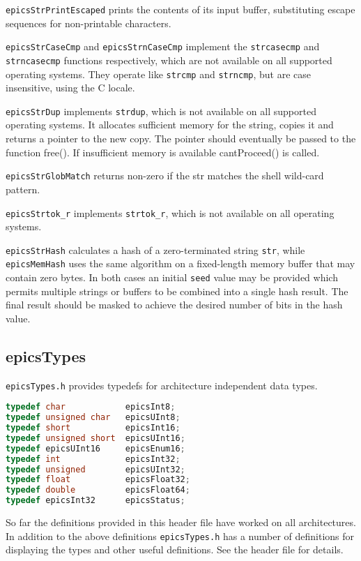 \verb|epicsStrPrintEscaped| prints the contents of its input buffer, substituting escape sequences for non-printable characters.

\verb|epicsStrCaseCmp| and \verb|epicsStrnCaseCmp| implement the \verb|strcasecmp| and \verb|strncasecmp| functions respectively, which are not available on all supported operating systems.
They operate like \verb|strcmp| and \verb|strncmp|, but are case insensitive, using the C locale.

\verb|epicsStrDup| implements \verb|strdup|, which is not available on all supported operating systems.
It allocates sufficient memory for the string, copies it and returns a pointer to the new copy.
The pointer should eventually be passed to the function free().
If insufficient memory is available cantProceed() is called.

\verb|epicsStrGlobMatch| returns non-zero if the str matches the shell wild-card pattern.

\verb|epicsStrtok_r| implements \verb|strtok_r|, which is not available on all operating systems.

\verb|epicsStrHash| calculates a hash of a zero-terminated string \verb|str|, while \verb|epicsMemHash| uses the same algorithm on a fixed-length memory buffer that may contain zero bytes.
In both cases an initial \verb|seed| value may be provided which permits multiple strings or buffers to be combined into a single hash result.
The final result should be masked to achieve the desired number of bits in the hash value.

\subsection{epicsTypes}

\verb|epicsTypes.h| provides typedefs for architecture independent data types.

\begin{lstlisting}[language=C]
typedef char            epicsInt8;
typedef unsigned char   epicsUInt8;
typedef short           epicsInt16;
typedef unsigned short  epicsUInt16;
typedef epicsUInt16     epicsEnum16;
typedef int             epicsInt32;
typedef unsigned        epicsUInt32;
typedef float           epicsFloat32;
typedef double          epicsFloat64;
typedef epicsInt32      epicsStatus;
\end{lstlisting}

So far the definitions provided in this header file have worked on all architectures.
In addition to the above definitions \verb|epicsTypes.h| has a number of definitions for displaying the types and other useful definitions.
See the header file for details.

